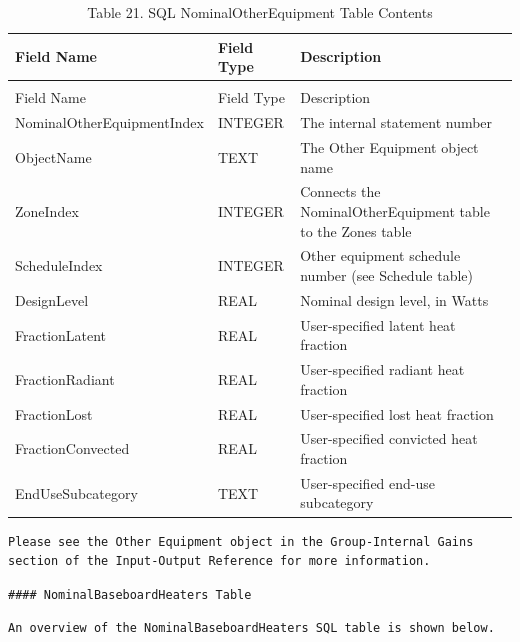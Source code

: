 \begin{longtable}[c]{p{1.5in}p{1.5in}p{2.99in}}
\caption{Table 21. SQL NominalOtherEquipment Table Contents \label{table:table-21.-sql-nominalotherequipment-table}} \tabularnewline
\toprule 
Field Name & Field Type & Description \tabularnewline
\midrule
\endfirsthead

\caption[]{Table 21. SQL NominalOtherEquipment Table Contents} \tabularnewline
\toprule 
Field Name & Field Type & Description \tabularnewline
\midrule
\endhead

NominalOtherEquipmentIndex & INTEGER & The internal statement number \tabularnewline
ObjectName & TEXT & The Other Equipment object name \tabularnewline
ZoneIndex & INTEGER & Connects the NominalOtherEquipment table to the Zones table \tabularnewline
ScheduleIndex & INTEGER & Other equipment schedule number (see Schedule table) \tabularnewline
DesignLevel & REAL & Nominal design level, in Watts \tabularnewline
FractionLatent & REAL & User-specified latent heat fraction \tabularnewline
FractionRadiant & REAL & User-specified radiant heat fraction \tabularnewline
FractionLost & REAL & User-specified lost heat fraction \tabularnewline
FractionConvected & REAL & User-specified convicted heat fraction \tabularnewline
EndUseSubcategory & TEXT & User-specified end-use subcategory \tabularnewline
\bottomrule
\end{longtable}

\begin{lstlisting}
Please see the Other Equipment object in the Group-Internal Gains section of the Input-Output Reference for more information.
\end{lstlisting}

\begin{lstlisting}
#### NominalBaseboardHeaters Table
\end{lstlisting}

\begin{lstlisting}
An overview of the NominalBaseboardHeaters SQL table is shown below.
\end{lstlisting}

